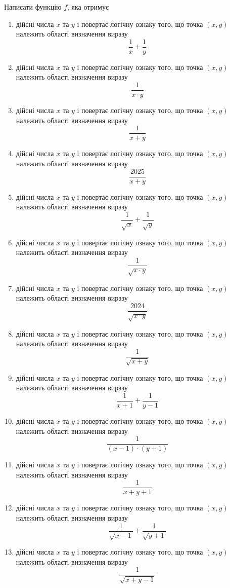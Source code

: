 \documentclass[12pt,a4paper]{article}
\begin{document}
Написати функцію $f$, яка отримує

\begin{enumerate}
    \item дійсні числа $x$ та $y$ і повертає логічну ознаку того, що точка $(x, y)$ належить області визначення виразу $$\frac{1}{x} + \frac{1}{y}$$
    \item дійсні числа $x$ та $y$ і повертає логічну ознаку того, що точка $(x, y)$ належить області визначення виразу $$\frac{1}{x \cdot y}$$
    \item дійсні числа $x$ та $y$ і повертає логічну ознаку того, що точка $(x, y)$ належить області визначення виразу $$\frac{1}{x + y}$$
    \item дійсні числа $x$ та $y$ і повертає логічну ознаку того, що точка $(x, y)$ належить області визначення виразу $$\frac{2025}{x + y}$$
    \item дійсні числа $x$ та $y$ і повертає логічну ознаку того, що точка $(x, y)$ належить області визначення виразу $$\frac{1}{\sqrt{x}} + \frac{1}{\sqrt{y}}$$
    \item дійсні числа $x$ та $y$ і повертає логічну ознаку того, що точка $(x, y)$ належить області визначення виразу $$\frac{1}{\sqrt{x \cdot y}}$$
    \item дійсні числа $x$ та $y$ і повертає логічну ознаку того, що точка $(x, y)$ належить області визначення виразу $$\frac{2024}{\sqrt{x \cdot y}}$$
    \item дійсні числа $x$ та $y$ і повертає логічну ознаку того, що точка $(x, y)$ належить області визначення виразу $$\frac{1}{\sqrt{x + y}}$$

    \item дійсні числа $x$ та $y$ і повертає логічну ознаку того, що точка $(x, y)$ належить області визначення виразу $$\frac{1}{x+1} + \frac{1}{y-1}$$
    \item дійсні числа $x$ та $y$ і повертає логічну ознаку того, що точка $(x, y)$ належить області визначення виразу $$\frac{1}{(x-1) \cdot (y+1)}$$
    \item дійсні числа $x$ та $y$ і повертає логічну ознаку того, що точка $(x, y)$ належить області визначення виразу $$\frac{1}{x + y + 1}$$
    \item дійсні числа $x$ та $y$ і повертає логічну ознаку того, що точка $(x, y)$ належить області визначення виразу $$\frac{1}{\sqrt{x-1}} + \frac{1}{\sqrt{y+1}}$$
    \item дійсні числа $x$ та $y$ і повертає логічну ознаку того, що точка $(x, y)$ належить області визначення виразу $$\frac{1}{\sqrt{x + y - 1}}$$
    

\end{enumerate}
\end{document}

